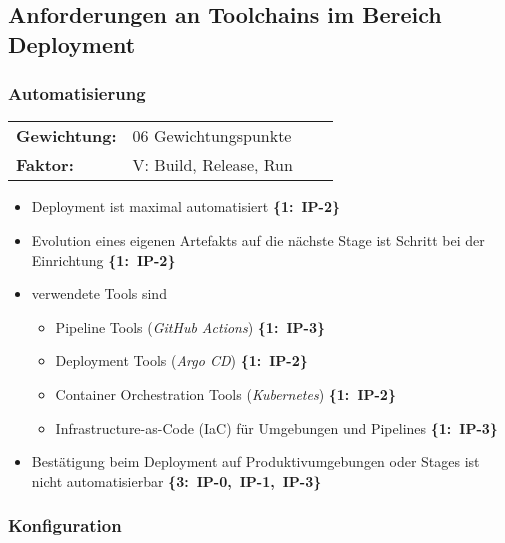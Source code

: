 \subsection{Anforderungen an Toolchains im Bereich Deployment}
\label{subsec:AA-04-02_requirements-deployment}

\subsubsection{Automatisierung}
\label{subsubsec:AA-04-02-01_req-dep-automation}

\vspace{0.5em}
\begin{tabular}{ll@{}ll@{}}
    \textbf{Gewichtung:}    &   06 Gewichtungspunkte    \\
    \textbf{Faktor:}        &   V: Build, Release, Run  \\
\end{tabular}

\begin{flushleft}
    \begin{itemize}
        \item Deployment ist maximal automatisiert \mbox{\textbf{\{1: IP-2\}}}
        \item Evolution eines eigenen Artefakts auf die nächste Stage \linebreak[1] ist Schritt bei der Einrichtung \mbox{\textbf{\{1: IP-2\}}}
        \item verwendete Tools sind
        \begin{itemize}
            \item Pipeline Tools (\textit{GitHub Actions}) \mbox{\textbf{\{1: IP-3\}}}
            \item Deployment Tools (\textit{Argo CD}) \mbox{\textbf{\{1: IP-2\}}}
            \item Container Orchestration Tools (\textit{Kubernetes}) \mbox{\textbf{\{1: IP-2\}}}
            \item Infrastructure-as-Code (IaC) für Umgebungen und Pipelines \mbox{\textbf{\{1: IP-3\}}}
        \end{itemize}
        \item Bestätigung beim Deployment auf Produktivumgebungen oder Stages \linebreak[1] ist nicht automatisierbar \mbox{\textbf{\{3: IP-0, IP-1, IP-3\}}}
    \end{itemize}
\end{flushleft}

\subsubsection{Konfiguration}
\label{subsubsec:AA-04-02-02_req-dep-configuration}

